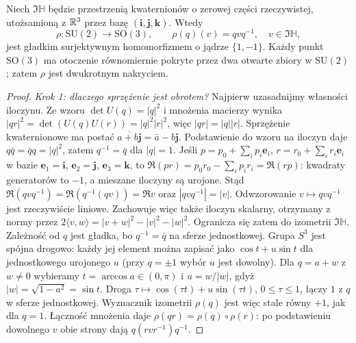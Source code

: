 \begin{twierdzenie}
\label{thm:su2-so3-cover-lie}
Niech $\Im\mathbb H$ będzie przestrzenią
kwaternionów o zerowej części rzeczywistej, utożsamioną
z $\mathbb{R}^3$ przez bazę $(\mathbf i,\mathbf j,\mathbf k)$.
Wtedy
\[
 \rho:\mathrm{SU}(2)\longrightarrow\mathrm{SO}(3),
 \qquad \rho(q)(v)=qvq^{-1},\quad
 v\in\Im\mathbb H,
\]
jest gładkim surjektywnym homomorfizmem o jądrze
$\{1,-1\}$. Każdy punkt $\mathrm{SO}(3)$ ma otoczenie
równomiernie pokryte przez dwa otwarte zbiory w
$\mathrm{SU}(2)$; zatem $\rho$ jest dwukrotnym nakryciem.
\end{twierdzenie}
\begin{proof}
\emph{Krok 1: dlaczego sprzężenie jest obrotem?}
Najpierw uzasadnijmy własności iloczynu.
Ze wzoru $\det U(q)=|q|^2$ i mnożenia macierzy wynika
$|qr|^2=\det(U(q)U(r))=|q|^2|r|^2$,
więc $|qr|=|q||r|$.
Sprzężenie kwaternionowe ma postać
$\overline{a+b\mathbf j}=\bar a-b\mathbf j$.
Podstawienie do wzoru na iloczyn daje
$q\bar q=\bar q q=|q|^2$, zatem $q^{-1}=\bar q$ dla $|q|=1$.
Jeśli $p=p_0+\sum_i p_i\mathbf e_i$,
$r=r_0+\sum_i r_i\mathbf e_i$ w bazie
$\mathbf e_1=\mathbf i$, $\mathbf e_2=\mathbf j$,
$\mathbf e_3=\mathbf k$, to
$\Re(pr)=p_0r_0-\sum_i p_ir_i=\Re(rp)$:
kwadraty generatorów to $-1$, a mieszane iloczyny są urojone.
Stąd
$\Re(qvq^{-1})=\Re(q^{-1}(qv))=\Re v$
oraz $|qvq^{-1}|=|v|$.
Odwzorowanie $v\mapsto qvq^{-1}$ jest rzeczywiście liniowe.
Zachowuje więc także iloczyn skalarny, otrzymany z normy przez
$2\langle v,w\rangle=|v+w|^2-|v|^2-|w|^2$.
Ogranicza się zatem do izometrii $\Im\mathbb H$.
Zależność od $q$ jest
gładka, bo $q^{-1}=\bar q$ na sferze jednostkowej.
Grupa $S^3$ jest spójna drogowo: każdy jej element
można zapisać jako $\cos t+u\sin t$ dla jednostkowego
urojonego $u$ (przy $q=\pm1$ wybór $u$ jest dowolny).
Dla $q=a+w$ z $w\ne0$ wybieramy $t=\arccos a\in(0,\pi)$
i $u=w/|w|$, gdyż $|w|=\sqrt{1-a^2}=\sin t$.
Droga $\tau\mapsto\cos(\tau t)+u\sin(\tau t)$,
$0\leq\tau\leq1$, łączy $1$ z $q$ w sferze jednostkowej.
Wyznacznik izometrii $\rho(q)$ jest więc stale równy
$+1$, jak dla $q=1$. Łączność mnożenia daje
$\rho(qr)=\rho(q)\circ\rho(r)$:
po podstawieniu dowolnego $v$ obie strony dają
$q(rv r^{-1})q^{-1}$.


\end{proof}
